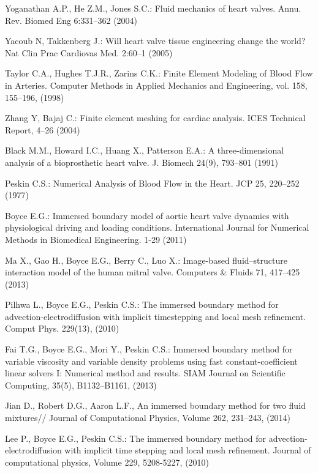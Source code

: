 \documentclass[runningheads,a4paper]{llncs}
\begin{document}
\begin{thebibliography}{4}

 Yoganathan A.P., He Z.M., Jones S.C.: Fluid mechanics of heart valves. Annu. Rev. Biomed Eng 6:331--362 (2004)

 Yacoub N, Takkenberg J.: Will heart valve tissue engineering change the world? Nat Clin Prac Cardiovas Med. 2:60--1 (2005)

 Taylor C.A., Hughes T.J.R., Zarins C.K.: Finite Element Modeling of Blood Flow in Arteries.
Computer Methods in Applied Mechanics and Engineering, vol. 158, 155--196, (1998)

 Zhang Y, Bajaj C.: Finite element meshing for cardiac analysis. ICES Technical Report, 4--26 (2004)

 Black M.M., Howard I.C., Huang X., Patterson E.A.: A three-dimensional analysis of a bioprosthetic heart valve. J. Biomech 24(9), 793--801 (1991)

 Peskin C.S.: Numerical Analysis of Blood Flow in the Heart. JCP 25, 220--252 (1977)

 Boyce E.G.: Immersed boundary model of aortic heart valve dynamics with physiological driving and loading conditions. International Journal for Numerical Methods in Biomedical Engineering. 1-29 (2011)

 Ma X., Gao H., Boyce E.G., Berry C., Luo X.: Image-based fluid–structure interaction model of the human mitral valve. Computers \& Fluids 71, 417–425 (2013)

 Pilhwa L., Boyce E.G., Peskin C.S.: The immersed boundary method for advection-electrodiffusion with implicit timestepping and local mesh refinement. Comput Phys. 229(13), (2010)

 Fai T.G., Boyce E.G., Mori Y., Peskin C.S.: Immersed boundary method for variable viscosity and variable density problems using fast constant-coefficient linear solvers I: Numerical method and results. SIAM Journal on Scientific Computing, 35(5), B1132–B1161, (2013)

 Jian D., Robert D.G., Aaron L.F., An immersed boundary method for two fluid mixtures// Journal of Computational Physics, Volume 262, 231--243, (2014)

 Lee P., Boyce E.G., Peskin C.S.: The immersed boundary method for advection-electrodiffusion with implicit time stepping and local mesh refinement. Journal of computational physics, Volume 229, 5208-5227, (2010)


\end{thebibliography}
\end{document}

